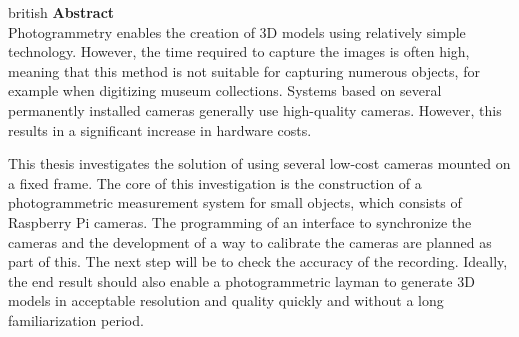 \documentclass[a4paper,12pt,bibliography=totoc, listof=totoc, titlepage]{scrreprt}
\begin{document}
\vspace{2cm}
\begin{otherlanguage*}{british}
    \noindent\textbf{\large Abstract}\\
    Photogrammetry enables the creation of 3D models using relatively simple technology. However, the time required to capture the images is often high, meaning that this method is not suitable for capturing numerous objects, for example when digitizing museum collections. Systems based on several permanently installed cameras generally use high-quality cameras. However, this results in a significant increase in hardware costs.

    This thesis investigates the solution of using several low-cost cameras mounted on a fixed frame. The core of this investigation is the construction of a photogrammetric measurement system for small objects, which consists of Raspberry Pi cameras. The programming of an interface to synchronize the cameras and the development of a way to calibrate the cameras are planned as part of this. The next step will be to check the accuracy of the recording. Ideally, the end result should also enable a photogrammetric layman to generate 3D models in acceptable resolution and quality quickly and without a long familiarization period.
\end{otherlanguage*}
\newpage

\tableofcontents
\newpage

\setcounter{page}{1}

















\clearpage

\printglossaries

\clearpage
\renewcommand\UrlFont\itshape
\renewcommand{\refname}{Literaturverzeichnis}

\listoffigures
\listoftables


\renewcommand{\appendixpagename}{\appendixname}
\renewcommand{\appendixtocname}{\appendixname}
\begin{appendices}
    
    
    
    
\end{appendices}
\end{document}
